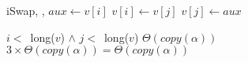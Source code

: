 \begin{Algoritmos}
  \begin{algoritmo}{iSwap}{, , }{}
    \tipo{$\alpha$} $aux \gets v[i]$ 
    $v[i] \gets v[j]$ 
    $v[j] \gets aux$ 
  \end{algoritmo}
  \datosAlgoritmo{} %
  {$i < \,$ long($v$) $\land$ $j < \,$ long($v$)} %
  {} %
  {$\Theta(copy(\alpha))$} %
  {$3 \times \Theta(copy(\alpha)) = \Theta(copy(\alpha))$} %

\end{Algoritmos}
